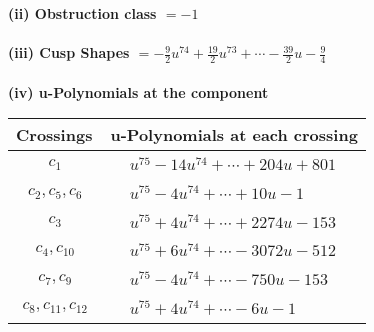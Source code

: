 \documentclass[1p]{elsarticle_modified}
\theoremstyle{definition}
\begin{document}
\flushleft \textbf{(ii) Obstruction class $= -1$}\\~\\
\flushleft \textbf{(iii) Cusp Shapes $= -\frac{9}{2} u^{74}+\frac{19}{2} u^{73}+\cdots-\frac{39}{2} u-\frac{9}{4}$}\\~\\
\newpage\renewcommand{\arraystretch}{1}
\flushleft \textbf{(iv) u-Polynomials at the component}\newline \\
\begin{tabular}{m{50pt}|m{274pt}}
Crossings & \hspace{64pt}u-Polynomials at each crossing \\
\hline $$\begin{aligned}c_{1}\end{aligned}$$&$\begin{aligned}
&u^{75}-14 u^{74}+\cdots+204 u+801
\end{aligned}$\\
\hline $$\begin{aligned}c_{2},c_{5},c_{6}\end{aligned}$$&$\begin{aligned}
&u^{75}-4 u^{74}+\cdots+10 u-1
\end{aligned}$\\
\hline $$\begin{aligned}c_{3}\end{aligned}$$&$\begin{aligned}
&u^{75}+4 u^{74}+\cdots+2274 u-153
\end{aligned}$\\
\hline $$\begin{aligned}c_{4},c_{10}\end{aligned}$$&$\begin{aligned}
&u^{75}+6 u^{74}+\cdots-3072 u-512
\end{aligned}$\\
\hline $$\begin{aligned}c_{7},c_{9}\end{aligned}$$&$\begin{aligned}
&u^{75}-4 u^{74}+\cdots-750 u-153
\end{aligned}$\\
\hline $$\begin{aligned}c_{8},c_{11},c_{12}\end{aligned}$$&$\begin{aligned}
&u^{75}+4 u^{74}+\cdots-6 u-1
\end{aligned}$\\
\hline
\end{tabular}\\~\\
\end{document}
